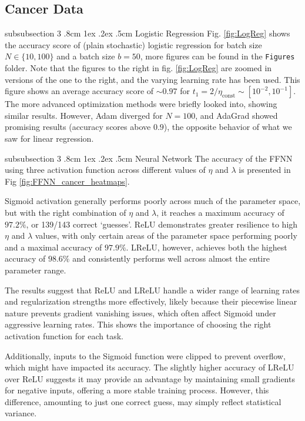 \documentclass[%
reprint,s
amsmath,amssymb,
aps,
]{revtex4-2}
\makeatletter
\renewcommand{\subsubsection}{%
	\@startsection
	{subsubsection}%
	{3}%
	{\z@}%
	{.8cm \@plus1ex \@minus .2ex}%
	{.5cm}%
	{\normalfont\small\centering}%
}
\makeatother
\begin{document}
\subsection{Cancer Data}
\subsubsection{Logistic Regression} \label{sec:cancer_data_logisit_regression}
Fig. \ref{fig:LogReg} shows the accuracy score of (plain stochastic) logistic regression for batch size \(N\in\{10, 100\}\) and a batch size \(b=50\), more figures can be found in the \texttt{Figures} folder. Note that the figures to the right in fig. \ref{fig:LogReg} are zoomed in versions of the one to the right, and the varying learning rate has been used. This figure shows an average accuracy score of \(\sim 0.97\) for \(t_1 = 2/\eta_{\text{const}} \sim[10^{-2}, 10^{-1}]\). The more advanced optimization methods were briefly looked into, showing similar results. However, Adam diverged for \(N=100\), and AdaGrad showed promising results (accuracy scores above \(0.9\)), the opposite behavior of what we saw for linear regression.

\subsubsection{Neural Network}  
The accuracy of the FFNN using three activation function across different values of $\eta$ and $\lambda$ is presented in Fig \ref{fig:FFNN_cancer_heatmaps}. 

Sigmoid activation generally performs poorly across much of the parameter space, but with the right combination of $\eta$ and $\lambda$, it reaches a maximum accuracy of $97.2\%$, or 139/143 correct `guesses'.  ReLU demonstrates greater resilience to high $\eta$ and $\lambda$ values, with only certain areas of the parameter space performing poorly and a maximal accuracy of $97.9\%$. LReLU, however, achieves both the highest accuracy of $98.6\%$ and consistently performs well across almost the entire parameter range.

The results suggest that ReLU and LReLU handle a wider range of learning rates and regularization strengths more effectively, likely because their piecewise linear nature prevents gradient vanishing issues, which often affect Sigmoid under aggressive learning rates. This shows the importance of choosing the right activation function for each task. 

Additionally, inputs to the Sigmoid function were clipped to prevent overflow, which might have impacted its accuracy. The slightly higher accuracy of LReLU over ReLU suggests it may provide an advantage by maintaining small gradients for negative inputs, offering a more stable training process. However, this difference, amounting to just one correct guess, may simply reflect statistical variance.
\end{document}
